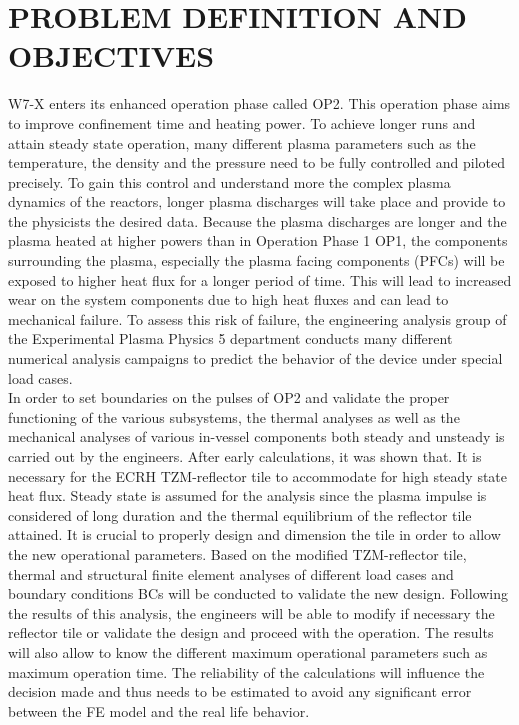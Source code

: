 \section{PROBLEM DEFINITION AND OBJECTIVES}
\normalsize{W7-X enters its enhanced operation phase called \acrshort{OP2}. This operation phase aims to improve confinement time and heating power. To achieve longer runs and attain steady state operation, many different plasma parameters such as the temperature, the density and the pressure need to be fully controlled and piloted precisely. To gain this control and understand more the complex plasma dynamics of the reactors, longer plasma discharges will take place and provide to the physicists the desired data. Because the plasma discharges are longer and the plasma heated at higher powers than in Operation Phase 1 \acrshort{OP1}, the components surrounding the plasma, especially the plasma facing components (\acrshort{PFCs}) will be exposed to higher heat flux for a longer period of time. This will lead to increased wear on the system components due to high heat fluxes and can lead to mechanical failure. To assess this risk of failure, the engineering analysis group of the Experimental Plasma Physics 5 department conducts many different numerical analysis campaigns to predict the behavior of the device under special load cases.}
\\
\break
\normalsize{\indent In order to set boundaries on the pulses of \acrshort{OP2} and validate the proper functioning of the various subsystems, the thermal analyses as well as the mechanical analyses of various in-vessel components both steady and unsteady is carried out by the engineers. After early calculations, it was shown that. It is necessary for the \acrshort{ECRH} TZM-reflector tile to accommodate for high steady state heat flux. Steady state is assumed for the analysis since the plasma impulse is considered of long duration and the thermal equilibrium of the reflector tile attained. It is crucial to properly design and dimension the tile in order to allow the new operational parameters. Based on the modified TZM-reflector tile, thermal and structural finite element analyses of different load cases and boundary conditions \acrshort{BCs} will be conducted to validate the new design. Following the results of this analysis, the engineers will be able to modify if necessary the reflector tile or validate the design and proceed with the operation. The results will also allow to know the different maximum operational parameters such as maximum operation time. The reliability of the calculations will influence the decision made and thus needs to be estimated to avoid any significant error between the FE model and the real life behavior.}
